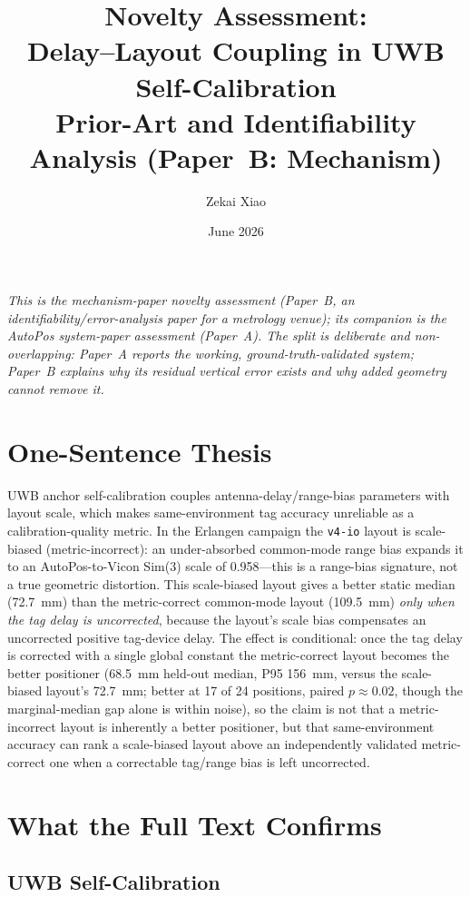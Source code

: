 \documentclass[11pt,a4paper]{article}
\title{Novelty Assessment:\\
       Delay--Layout Coupling in UWB Self-Calibration\\[5pt]
       \large Prior-Art and Identifiability Analysis (Paper~B: Mechanism)}
\author{Zekai Xiao}
\date{June 2026}
\begin{document}
\maketitle

\textit{This is the mechanism-paper novelty assessment (Paper~B, an identifiability/error-analysis
paper for a metrology venue); its companion is the AutoPos system-paper assessment (Paper~A). The
split is deliberate and non-overlapping: Paper~A reports the working, ground-truth-validated system;
Paper~B explains \emph{why} its residual vertical error exists and why added geometry cannot
remove it.}

\section{One-Sentence Thesis}

UWB anchor self-calibration couples antenna-delay/range-bias parameters with layout scale, which makes same-environment tag accuracy unreliable as a calibration-quality metric. In the Erlangen campaign the \texttt{v4-io} layout is scale-biased (metric-incorrect): an under-absorbed common-mode range bias expands it to an AutoPos-to-Vicon Sim(3) scale of 0.958---this is a range-bias signature, not a true geometric distortion. This scale-biased layout gives a better static median (72.7~mm) than the metric-correct common-mode layout (109.5~mm) \emph{only when the tag delay is uncorrected}, because the layout's scale bias compensates an uncorrected positive tag-device delay. The effect is conditional: once the tag delay is corrected with a single global constant the metric-correct layout becomes the better positioner (68.5~mm held-out median, P95 156~mm, versus the scale-biased layout's 72.7~mm; better at 17 of 24 positions, paired $p\approx0.02$, though the marginal-median gap alone is within noise), so the claim is not that a metric-incorrect layout is inherently a better positioner, but that same-environment accuracy can rank a scale-biased layout above an independently validated metric-correct one when a correctable tag/range bias is left uncorrected.

\section{What the Full Text Confirms}

\subsection{UWB Self-Calibration}
\end{document}
